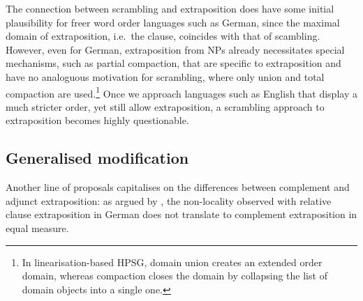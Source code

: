 \documentclass[output=paper
                ,modfonts
                ,nonflat
	        ,collection
	        ,collectionchapter
	        ,collectiontoclongg
 	        ,biblatex
                ,babelshorthands
                ,newtxmath
                ,draftmode
                ,colorlinks, citecolor=brown
]{./langsci/langscibook}
\begin{document}
{The connection between scrambling and extraposition does have some
initial plausibility for freer word order languages such as German,
since the maximal domain of extraposition, i.e.\ the clause, coincides
with that of scambling. However, even for German, extraposition from
NPs already necessitates special mechanisms, such as partial
compaction, that are specific to extraposition and have no analoguous
motivation for scrambling, where only union and total compaction are
used.\footnote{In linearisation-based HPSG, domain union creates an
  extended order domain, whereas compaction closes the domain by
  collapsing the list of domain objects into a single one.} Once we
approach languages such as English that display a much stricter order,
yet still allow extraposition, a scrambling approach to extraposition
becomes highly questionable.


\subsection{Generalised modification}

Another line of proposals capitalises on the differences between
complement and adjunct extraposition: as argued by
\citet{kiss_t02nllt}, the non-locality observed with relative clause
extraposition in German does not translate to complement extraposition
in equal measure.

\begin{exe}
  \ex \label{ex:ExtraNP}
  \begin{xlist}

  \end{xlist}
\end{exe}

}
\end{document}

